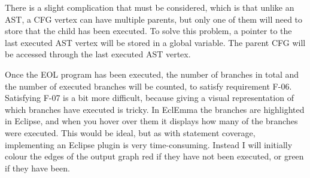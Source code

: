 There is a slight complication that must be considered, which is that unlike an AST, a CFG vertex can have multiple parents, but only one of them will need to store that the child has been executed. To solve this problem, a pointer to the last executed AST vertex will be stored in a global variable. The parent CFG will be accessed through the last executed AST vertex.

Once the EOL program has been executed, the number of branches in total and the number of executed branches will be counted, to satisfy requirement F-06. Satisfying F-07 is a bit more difficult, because giving a visual representation of which branches have executed is tricky. In EclEmma the branches are highlighted in Eclipse, and when you hover over them it displays how many of the branches were executed. This would be ideal, but as with statement coverage, implementing an Eclipse plugin is very time-consuming. Instead I will initially colour the edges of the output graph red if they have not been executed, or green if they have been.